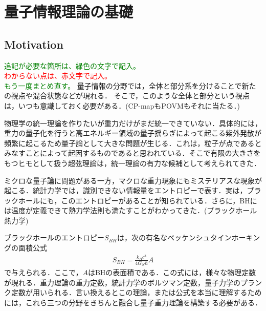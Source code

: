 \chapter{量子情報理論の基礎}

\section{Motivation}
\textcolor{green}{追記が必要な箇所は、緑色の文字で記入。}
\\

\textcolor{red}{わからない点は、赤文字で記入。}
\\

\textcolor{green}{もう一度まとめ直す。}
量子情報の分野では，全体と部分系を分けることで新たの視点や混合状態などが現れる．
そこで，このような全体と部分という視点は，いつも意識しておく必要がある．(CP-mapもPOVMもそれに当たる．)

物理学の統一理論を作りたいが重力だけがまだ統一できていない．具体的には，重力の量子化を行うと高エネルギー領域の量子揺らぎによって起こる紫外発散が頻繁に起こるため量子論として大きな問題が生じる．これは，粒子が点であるとみなすことによって起因するものであると思われている．そこで有限の大きさをもつヒモとして扱う超弦理論は，統一理論の有力な候補として考えられてきた．

ミクロな量子論に問題がある一方，マクロな重力現象にもミステリアスな現象が起こる．統計力学では，識別できない情報量をエントロピーで表す．実は，ブラックホールにも，このエントロピーがあることが知られている．さらに，BHには温度が定義できて熱力学法則も満たすことがわかってきた．(ブラックホール熱力学)

ブラックホールのエントロピー$S_{BH}$は，次の有名なベッケンシュタインホーキングの面積公式
\begin{align}
  S_{BH}=\frac{k_{B}c^3}{4G_{N}\hbar}A
\end{align}
で与えられる．ここで，$A$はBHの表面積である．この式には，様々な物理定数が現れる．重力理論の重力定数，統計力学のボルツマン定数，量子力学のプランク定数が用いられる．言い換えるとこの理論，または公式を本当に理解するためには，これら三つの分野をきちんと融合し量子重力理論を構築する必要がある．

